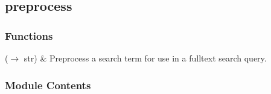 \documentclass[letterpaper,10pt,english]{sphinxmanual}
\begin{document}

\begin{fulllineitems}
\label{\detokenize{autoapi/assistant/index:assistant.opt}}
\pysigstartsignatures
{}
\pysigstopsignatures
\end{fulllineitems}


\sphinxstepscope


\subsection{preprocess}
\label{\detokenize{autoapi/preprocess/index:module-preprocess}}\label{\detokenize{autoapi/preprocess/index:preprocess}}\label{\detokenize{autoapi/preprocess/index::doc}}

\subsubsection{Functions}
\label{\detokenize{autoapi/preprocess/index:functions}}

\begin{savenotes}\sphinxattablestart
\sphinxthistablewithglobalstyle
\sphinxthistablewithnovlinesstyle
\centering
\begin{tabulary}{\linewidth}[t]{}
\sphinxtoprule
\sphinxtableatstartofbodyhook
\sphinxAtStartPar
{}(\(\rightarrow\) str)
&
\sphinxAtStartPar
Preprocess a search term for use in a full\sphinxhyphen{}text search query.
\\
\sphinxbottomrule
\end{tabulary}
\sphinxtableafterendhook\par
\sphinxattableend\end{savenotes}


\subsubsection{Module Contents}
\label{\detokenize{autoapi/preprocess/index:module-contents}}
\end{document}
